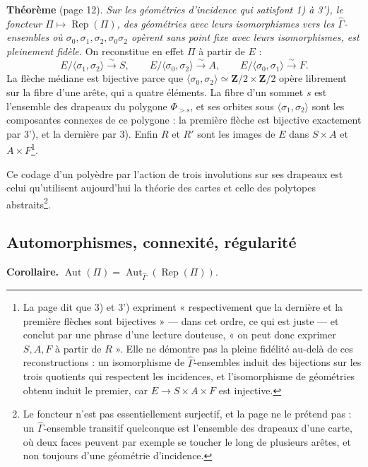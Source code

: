 \documentclass[11pt,a4paper]{article}
\begin{document}
\textbf{Théorème} (page 12). \emph{Sur les géométries d'incidence qui
satisfont 1) à 3'), le foncteur $\Pi \mapsto \operatorname{Rep}(\Pi)$, des
géométries avec leurs isomorphismes vers les $\widehat{\Gamma}$-ensembles où
$\sigma_0, \sigma_1, \sigma_2, \sigma_0\sigma_2$ opèrent sans point fixe avec
leurs isomorphismes, est pleinement fidèle.} On reconstitue en effet $\Pi$
à partir de $E$ :
\[
E/\langle \sigma_1, \sigma_2 \rangle \xrightarrow{\ \sim\ } S, \qquad
E/\langle \sigma_0, \sigma_2 \rangle \xrightarrow{\ \sim\ } A, \qquad
E/\langle \sigma_0, \sigma_1 \rangle \xrightarrow{\ \sim\ } F .
\]
La flèche médiane est bijective parce que $\langle \sigma_0, \sigma_2 \rangle
\simeq \mathbf{Z}/2 \times \mathbf{Z}/2$ opère librement sur la fibre d'une
arête, qui a quatre éléments. La fibre d'un sommet $s$ est l'ensemble des
drapeaux du polygone $\Phi_{>s}$, et ses orbites sous $\langle \sigma_1,
\sigma_2 \rangle$ sont les composantes connexes de ce polygone : la première
flèche est bijective exactement par 3'), et la dernière par 3). Enfin $R$ et
$R'$ sont les images de $E$ dans $S \times A$ et $A \times F$\footnote{La page
dit que 3) et 3') expriment « respectivement que la dernière et la première
flèches sont bijectives » --- dans cet ordre, ce qui est juste --- et conclut
par une phrase d'une lecture douteuse, « on peut donc exprimer $S, A, F$ à
partir de $R$ ». Elle ne démontre pas la pleine fidélité au-delà de ces
reconstructions : un isomorphisme de $\widehat{\Gamma}$-ensembles induit des
bijections sur les trois quotients qui respectent les incidences, et
l'isomorphisme de géométries obtenu induit le premier, car $E \to S \times A
\times F$ est injective.}.

Ce codage d'un polyèdre par l'action de trois involutions sur ses drapeaux est
celui qu'utilisent aujourd'hui la théorie des cartes et celle des polytopes
abstraits\footnote{Le foncteur n'est pas essentiellement surjectif, et la page
ne le prétend pas : un $\widehat{\Gamma}$-ensemble transitif quelconque est
l'ensemble des drapeaux d'une carte, où deux faces peuvent par exemple se
toucher le long de plusieurs arêtes, et non toujours d'une géométrie
d'incidence.}.

\subsection*{Automorphismes, connexité, régularité}

\textbf{Corollaire.} $\operatorname{Aut}(\Pi) =
\operatorname{Aut}_{\widehat{\Gamma}}(\operatorname{Rep}(\Pi))$.
\end{document}
